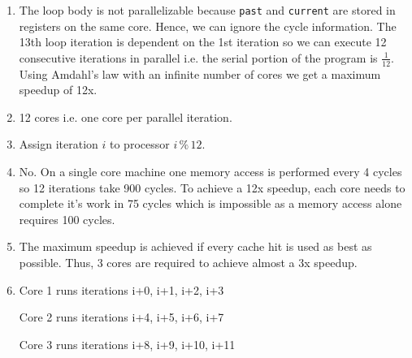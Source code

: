 \documentclass[a4paper]{article}
\begin{document}
\begin{enumerate}[label=\alph*)]
    \item The loop body is not parallelizable because \verb|past| and
    \verb|current| are stored in registers on the same core. Hence, we can
        ignore the cycle information. The 13th loop iteration is dependent on
        the 1st iteration so we can execute 12 consecutive iterations in
        parallel i.e. the serial portion of the program is $\frac{1}{12}$. Using
        Amdahl's law with an infinite number of cores we get a maximum speedup
        of 12x.

    \item 12 cores i.e. one core per parallel iteration.

    \item Assign iteration $i$ to processor $i \, \% \, 12$.

    \item No. On a single core machine one memory access is performed every
        4 cycles so 12 iterations take 900 cycles. To achieve a 12x speedup,
        each core needs to complete it's work in 75 cycles which is impossible
        as a memory access alone requires 100 cycles.

    \item The maximum speedup is achieved if every cache hit is used as best as
        possible. Thus, 3 cores are required to achieve almost a 3x speedup.

    \item Core 1 runs iterations i+0, i+1, i+2, i+3

        Core 2 runs iterations i+4, i+5, i+6, i+7

        Core 3 runs iterations i+8, i+9, i+10, i+11

\end{enumerate}
\end{document}
